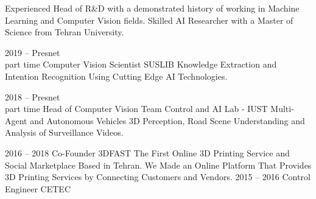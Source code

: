 \documentclass[9pt]{developercv} %
\begin{document}
\vspace{0.5cm}



\begin{minipage}[t]{0.4\textwidth} %
	\vspace{-\baselineskip} %
		Experienced Head of R\&D  with a demonstrated history of working in Machine Learning and Computer Vision fields. Skilled AI Researcher with a Master of Science from Tehran University.  %

\begin{center}
\end{center}

\end{minipage}
\hfill %
\begin{minipage}[t]{0.5\textwidth} %
	\vspace{-\baselineskip} %
	\begin{barchart}{5.5}
	\end{barchart}
\end{minipage}





\begin{entrylist}

	\entry
		{2019 -- Presnet\\\footnotesize{part time}}
		{Computer Vision Scientist}
		{SUSLIB}
		{Knowledge Extraction and Intention Recognition Using Cutting Edge AI Technologies.}

	\entry
		{2018 -- Presnet\\\footnotesize{part time}}
		{Head of Computer Vision Team}
		{Control and AI Lab - IUST}
		{Multi-Agent and Autonomous Vehicles 3D Perception, Road Scene Understanding and Analysis of Surveillance Videos.}

	\entry
		{2016 -- 2018}
		{Co-Founder}
		{3DFAST}
		{The First Online 3D Printing Service and Social Marketplace Based in Tehran. We Made an Online Platform That Provides 3D Printing Services by Connecting Customers and Vendors.}
	\entry
		{2015 -- 2016}
		{Control Engineer}
		{CETEC}
		{ }		
		
\end{entrylist}
\end{document}
